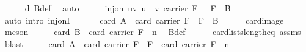 \begin{isabellebody}
\ \ \ \ \isamarkupfalse%
\ d\ B{\isacharunderscore}{\kern0pt}def\ \isamarkupfalse%
\ auto\isanewline
\ \ \isamarkupfalse%
\ \isamarkupfalse%
\ {\isachardoublequoteopen}inj{\isacharunderscore}{\kern0pt}on\ {\isacharparenleft}{\kern0pt}{\isasymlambda}{\isacharparenleft}{\kern0pt}u{\isacharcomma}{\kern0pt}v{\isacharparenright}{\kern0pt}{\isachardot}{\kern0pt}\ u\ {\isacharhash}{\kern0pt}\ v{\isacharparenright}{\kern0pt}\ {\isacharparenleft}{\kern0pt}{\isacharparenleft}{\kern0pt}carrier\ F\ {\isacharminus}{\kern0pt}\ \ {\isacharbraceleft}{\kern0pt}{\isasymzero}\isactrlbsub F\isactrlesub {\isacharbraceright}{\kern0pt}{\isacharparenright}{\kern0pt}\ {\isasymtimes}\ B{\isacharparenright}{\kern0pt}{\isachardoublequoteclose}\isanewline
\ \ \ \ \isamarkupfalse%
\ {\isacharparenleft}{\kern0pt}auto\ intro{\isacharbang}{\kern0pt}{\isacharcolon}{\kern0pt}\ inj{\isacharunderscore}{\kern0pt}onI{\isacharparenright}{\kern0pt}\ \isanewline
\ \ \isamarkupfalse%
\ \isamarkupfalse%
\ {\isachardoublequoteopen}card\ A\ {\isacharequal}{\kern0pt}\ card\ {\isacharparenleft}{\kern0pt}{\isacharparenleft}{\kern0pt}carrier\ F\ {\isacharminus}{\kern0pt}\ {\isacharbraceleft}{\kern0pt}{\isasymzero}\isactrlbsub F\isactrlesub {\isacharbraceright}{\kern0pt}{\isacharparenright}{\kern0pt}\ {\isasymtimes}\ B{\isacharparenright}{\kern0pt}{\isachardoublequoteclose}\isanewline
\ \ \ \ \isamarkupfalse%
\ card{\isacharunderscore}{\kern0pt}image\ \isamarkupfalse%
\ meson\isanewline
\ \ \isamarkupfalse%
\ \isamarkupfalse%
\ {\isachardoublequoteopen}card\ B\ {\isacharequal}{\kern0pt}\ {\isacharparenleft}{\kern0pt}card\ {\isacharparenleft}{\kern0pt}carrier\ F{\isacharparenright}{\kern0pt}\ {\isacharcircum}{\kern0pt}\ n{\isacharparenright}{\kern0pt}{\isachardoublequoteclose}\ \isamarkupfalse%
\ B{\isacharunderscore}{\kern0pt}def\isanewline
\ \ \ \ \isamarkupfalse%
\ card{\isacharunderscore}{\kern0pt}lists{\isacharunderscore}{\kern0pt}length{\isacharunderscore}{\kern0pt}eq\ assms{\isacharparenleft}{\kern0pt}{}{\isacharparenright}{\kern0pt}\ \isamarkupfalse%
\ blast\isanewline
\ \ \isamarkupfalse%
\ \isamarkupfalse%
\ {\isachardoublequoteopen}card\ A\ {\isacharequal}{\kern0pt}\ card\ {\isacharparenleft}{\kern0pt}carrier\ F\ {\isacharminus}{\kern0pt}\ {\isacharbraceleft}{\kern0pt}{\isasymzero}\isactrlbsub F\isactrlesub {\isacharbraceright}{\kern0pt}{\isacharparenright}{\kern0pt}\ {\isacharasterisk}{\kern0pt}\ {\isacharparenleft}{\kern0pt}card\ {\isacharparenleft}{\kern0pt}carrier\ F{\isacharparenright}{\kern0pt}\ {\isacharcircum}{\kern0pt}\ n{\isacharparenright}{\kern0pt}{\isachardoublequoteclose}\isanewline

\end{isabellebody}
